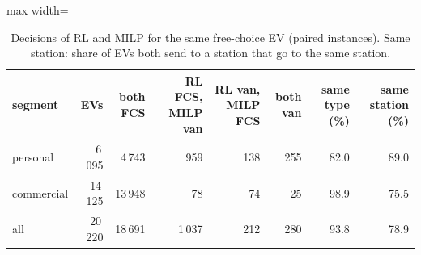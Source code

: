 \begin{table}[H]\centering
\small
\caption{Decisions of RL and MILP for the same free-choice EV (paired instances). Same station: share of EVs both send to a station that go to the same station.}\label{tab:confusion}
\begin{adjustbox}{max width=\textwidth}\begin{tabular}{lrrrrrrr}\toprule
segment & EVs & both FCS & RL FCS, MILP van & RL van, MILP FCS & both van & same type (\%) & same station (\%) \\ \midrule
personal & 6\,095 & 4\,743 & 959 & 138 & 255 & 82.0 & 89.0 \\
commercial & 14\,125 & 13\,948 & 78 & 74 & 25 & 98.9 & 75.5 \\
all & 20\,220 & 18\,691 & 1\,037 & 212 & 280 & 93.8 & 78.9 \\
\bottomrule\end{tabular}\end{adjustbox}\end{table}
